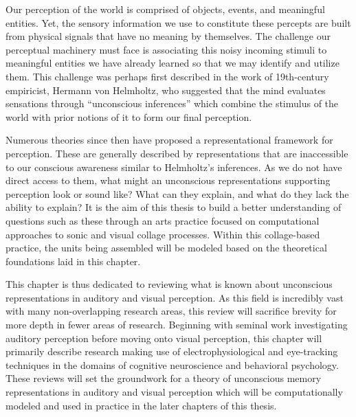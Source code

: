 Our perception of the world is comprised of objects, events, and meaningful entities.  Yet, the sensory information we use to constitute these percepts are built from physical signals that have no meaning by themselves.  The challenge our perceptual machinery must face is associating this noisy incoming stimuli to meaningful entities we have already learned so that we may identify and utilize them.  This challenge was perhaps first described in the work of 19th-century empiricist, Hermann von Helmholtz, who suggested that the mind evaluates sensations through ``unconscious inferences'' which combine the stimulus of the world with prior notions of it to form our final perception. 

Numerous theories since then have proposed a representational framework for perception.  These are generally described by representations that are inaccessible to our conscious awareness similar to Helmholtz's inferences.  As we do not have direct access to them, what might an unconscious representations supporting perception look or sound like?  What can they explain, and what do they lack the ability to explain?  It is the aim of this thesis to build a better understanding of questions such as these through an arts practice focused on computational approaches to sonic and visual collage processes.  Within this collage-based practice, the units being assembled will be modeled based on the theoretical foundations laid in this chapter.  

This chapter is thus dedicated to reviewing what is known about unconscious representations in auditory and visual perception.  As this field is incredibly vast with many non-overlapping research areas, this review will sacrifice brevity for more depth in fewer areas of research.  Beginning with seminal work investigating auditory perception before moving onto visual perception, this chapter will primarily describe research making use of electrophysiological and eye-tracking techniques in the domains of cognitive neuroscience and behavioral psychology.  These reviews will set the groundwork for a theory of unconscious memory representations in auditory and visual perception which will be computationally modeled and used in practice in the later chapters of this thesis.   



